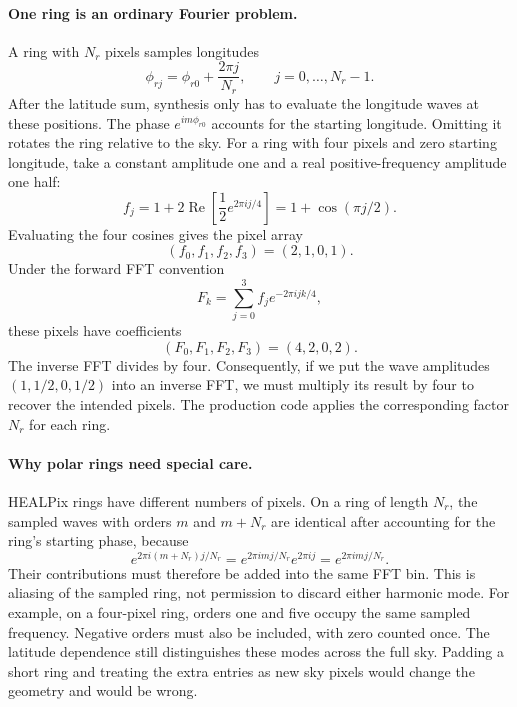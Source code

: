 \documentclass[11pt]{article}
\begin{document}
\paragraph{One ring is an ordinary Fourier problem.}
A ring with $N_r$ pixels samples longitudes
\begin{equation}
 \phi_{rj}=\phi_{r0}+\frac{2\pi j}{N_r},\qquad j=0,\ldots,N_r-1.
\end{equation}
After the latitude sum, synthesis only has to evaluate the longitude
waves at these positions. The phase $e^{im\phi_{r0}}$ accounts for the
starting longitude. Omitting it rotates the ring relative to the sky.
For a ring with four pixels and zero starting longitude, take a constant
amplitude one and a real positive-frequency amplitude one half:
\begin{equation}
 f_j=1+2\operatorname{Re}\left[\frac12 e^{2\pi i j/4}\right]
    =1+\cos(\pi j/2).
\end{equation}
Evaluating the four cosines gives the pixel array
\begin{equation}
 (f_0,f_1,f_2,f_3)=(2,1,0,1).
\end{equation}
Under the forward FFT convention
\begin{equation}
 F_k=\sum_{j=0}^{3}f_j e^{-2\pi i jk/4},
\end{equation}
these pixels have coefficients
\begin{equation}
 (F_0,F_1,F_2,F_3)=(4,2,0,2).
\end{equation}
The inverse FFT divides by four. Consequently, if we put the wave
amplitudes $(1,1/2,0,1/2)$ into an inverse FFT, we must multiply its result
by four to recover the intended pixels. The production code applies the
corresponding factor $N_r$ for each ring.

\paragraph{Why polar rings need special care.}
HEALPix rings have different numbers of pixels. On a ring of length $N_r$,
the sampled waves with orders $m$ and $m+N_r$ are identical after accounting
for the ring's starting phase, because
\begin{equation}
 e^{2\pi i(m+N_r)j/N_r}=e^{2\pi imj/N_r}e^{2\pi ij}
                       =e^{2\pi imj/N_r}.
\end{equation}
Their contributions must therefore be added into the same FFT bin. This
is aliasing of the sampled ring, not permission to discard either harmonic
mode. For example, on a four-pixel ring, orders one and five occupy the
same sampled frequency. Negative orders must also be included, with zero
counted once. The latitude dependence still distinguishes these modes
across the full sky. Padding a short ring and treating the extra entries
as new sky pixels would change the geometry and would be wrong.
\end{document}
